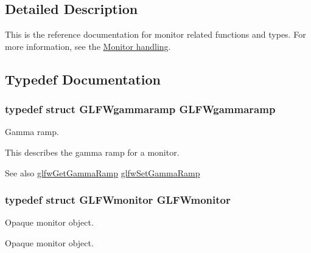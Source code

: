 \subsection{Detailed Description}
This is the reference documentation for monitor related functions and types. For more information, see the \hyperlink{group__monitor}{Monitor handling}. 

\subsection{Typedef Documentation}
\hypertarget{group__monitor_gaec0bd37af673be8813592849f13e02f0}{}
\subsubsection[{G\+L\+F\+Wgammaramp}]{\setlength{\rightskip}{0pt plus 5cm}typedef struct {\bf G\+L\+F\+Wgammaramp}  {\bf G\+L\+F\+Wgammaramp}}\label{group__monitor_gaec0bd37af673be8813592849f13e02f0}


Gamma ramp. 

This describes the gamma ramp for a monitor.

\begin{DoxySeeAlso}{See also}
\hyperlink{group__monitor_gaeeac9198f3c91b83440eed679441f76b}{glfw\+Get\+Gamma\+Ramp} \hyperlink{group__monitor_gac9f36a1cfa10eab191d3029ea8bc9558}{glfw\+Set\+Gamma\+Ramp} 
\end{DoxySeeAlso}
\hypertarget{group__monitor_ga8d9efd1cde9426692c73fe40437d0ae3}{}
\subsubsection[{G\+L\+F\+Wmonitor}]{\setlength{\rightskip}{0pt plus 5cm}typedef struct {\bf G\+L\+F\+Wmonitor} {\bf G\+L\+F\+Wmonitor}}\label{group__monitor_ga8d9efd1cde9426692c73fe40437d0ae3}


Opaque monitor object. 

Opaque monitor object. \hypertarget{group__monitor_ga8a7ee579a66720f24d656526f3e44c63}{}
